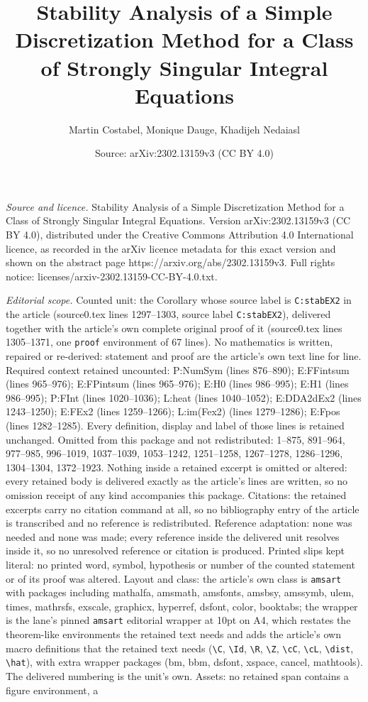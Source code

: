 \documentclass[10pt,a4paper]{amsart}
\title[Stability Analysis of a Simple Discretization Method for a C]{Stability Analysis of a Simple Discretization Method for a Class of Strongly Singular Integral Equations}
\author{Martin Costabel, Monique Dauge, Khadijeh Nedaiasl}
\date{Source: arXiv:2302.13159v3 (CC BY 4.0)}
\begin{document}
\maketitle

\noindent\emph{Source and licence.} Stability Analysis of a Simple Discretization Method for a Class of Strongly Singular Integral Equations. Version arXiv:2302.13159v3 (CC BY 4.0), distributed under the Creative Commons Attribution 4.0 International licence, as recorded in the arXiv licence metadata for this exact version and shown on the abstract page https://arxiv.org/abs/2302.13159v3. Full rights notice: licenses/arxiv-2302.13159-CC-BY-4.0.txt.\par\smallskip

\noindent\textit{Editorial scope.} Counted unit: the Corollary whose source label is \texttt{C:stabEX2} in the article (source0.tex lines 1297--1303, source label \texttt{C:stabEX2}), delivered together with the article's own complete original proof of it (source0.tex lines 1305--1371, one \texttt{proof} environment of 67 lines). No mathematics is written, repaired or re-derived: statement and proof are the article's own text line for line. Required context retained uncounted: P:NumSym (lines 876--890); E:FFintsum (lines 965--976); E:FPintsum (lines 965--976); E:H0 (lines 986--995); E:H1 (lines 986--995); P:FInt (lines 1020--1036); L:heat (lines 1040--1052); E:DDA2dEx2 (lines 1243--1250); E:FEx2 (lines 1259--1266); L:im(Fex2) (lines 1279--1286); E:Fpos (lines 1282--1285). Every definition, display and label of those lines is retained unchanged. Omitted from this package and not redistributed: 1--875, 891--964, 977--985, 996--1019, 1037--1039, 1053--1242, 1251--1258, 1267--1278, 1286--1296, 1304--1304, 1372--1923. Nothing inside a retained excerpt is omitted or altered: every retained body is delivered exactly as the article's lines are written, so no omission receipt of any kind accompanies this package. Citations: the retained excerpts carry no citation command at all, so no bibliography entry of the article is transcribed and no reference is redistributed. Reference adaptation: none was needed and none was made; every reference inside the delivered unit resolves inside it, so no unresolved reference or citation is produced. Printed slips kept literal: no printed word, symbol, hypothesis or number of the counted statement or of its proof was altered. Layout and class: the article's own class is \texttt{amsart} with packages including mathalfa, amsmath, amsfonts, amsbsy, amssymb, ulem, times, mathrsfs, exscale, graphicx, hyperref, dsfont, color, booktabs; the wrapper is the lane's pinned \texttt{amsart} editorial wrapper at 10pt on A4, which restates the theorem-like environments the retained text needs and adds the article's own macro definitions that the retained text needs (\texttt{\textbackslash C}, \texttt{\textbackslash Id}, \texttt{\textbackslash R}, \texttt{\textbackslash Z}, \texttt{\textbackslash cC}, \texttt{\textbackslash cL}, \texttt{\textbackslash dist}, \texttt{\textbackslash hat}), with extra wrapper packages (bm, bbm, dsfont, xspace, cancel, mathtools). The delivered numbering is the unit's own. Assets: no retained span contains a figure environment, a 
\end{document}

